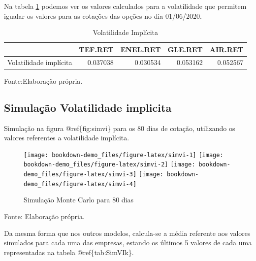 \documentclass[
  12pt,
  a4paper,
  openany]{book}
\begin{document}
\normalsize

Na tabela \ref{tab:tablevi} podemos ver os valores calculados para a volatilidade que permitem igualar os valores para as cotações das opções no dia 01/06/2020.

\begin{table}[!h]

\caption{\label{tab:tablevi}Volatilidade Implícita}
\centering
\begin{tabular}[t]{lrrrr}
\toprule
  & TEF.RET & ENEL.RET & GLE.RET & AIR.RET\\
\midrule
Volatilidade implícita & 0.037038 & 0.030534 & 0.053162 & 0.052567\\
\bottomrule
\end{tabular}
\end{table}
\FloatBarrier
\centering

Fonte:Elaboração própria.

\justifying
\bigskip

\hypertarget{simulauxe7uxe3o-volatilidade-implicita}{%
\subsection{Simulação Volatilidade implicita}\label{simulauxe7uxe3o-volatilidade-implicita}}

Simulação na figura @ref\{fig:simvi\} para os 80 dias de cotação, utilizando os valores referentes a volatilidade implícita.

\begin{figure}

{\centering \texttt{[image: bookdown-demo\_files/figure-latex/simvi-1]} \texttt{[image: bookdown-demo\_files/figure-latex/simvi-2]} \texttt{[image: bookdown-demo\_files/figure-latex/simvi-3]} \texttt{[image: bookdown-demo\_files/figure-latex/simvi-4]} 

}

\caption{Simulação Monte Carlo para 80 dias}\label{fig:simvi}
\end{figure}
\FloatBarrier
\centering

Fonte: Elaboração própria.

\justifying
\bigskip

Da mesma forma que nos outros modelos, calcula-se a média referente aos valores simulados para cada uma das empresas, estando os últimos 5 valores de cada uma representadas na tabela @ref\{tab:SimVIk\}.
\end{document}

